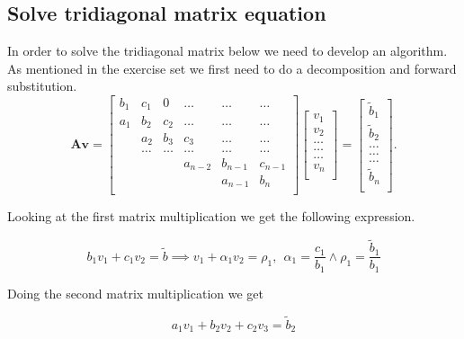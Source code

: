 \documentclass[reprint, english,notitlepage]{revtex4-1}  %
\begin{document}
\subsection{Solve tridiagonal matrix equation}

In order to solve the tridiagonal matrix below we need to develop an algorithm. As mentioned in the exercise set \citep{oppgavetekst} we first need to do a decomposition and forward substitution.
\begin{equation*}
\mathbf{A}\mathbf{v} = \begin{bmatrix}
b_1& c_1 & 0 &\dots   & \dots &\dots \\
a_1 & b_2 & c_2 &\dots &\dots &\dots \\
& a_2 & b_3 & c_3 & \dots & \dots \\
& \dots   & \dots &\dots   &\dots & \dots \\
&   &  &a_{n-2}  &b_{n-1}& c_{n-1} \\
&    &  &   &a_{n-1} & b_n \\
\end{bmatrix}\begin{bmatrix}
v_1\\
v_2\\
\dots \\
\dots  \\
\dots \\
v_n\\
\end{bmatrix}
=\begin{bmatrix}
\tilde{b}_1\\
\tilde{b}_2\\
\dots \\
\dots \\
\dots \\
\tilde{b}_n\\
\end{bmatrix}.
\end{equation*}

Looking at the first matrix multiplication we get the following expression.

\begin{equation}
	b_1 v_1 + c_1 v_2 = \tilde{b} \implies v_1 + \alpha_1 v_2 = \rho _1, \ \ \alpha_1 = \frac{c_1}{b_1} \wedge \rho_1 = \frac{\tilde{b}_1}{b_1} 
	\label{eq:mat1}
\end{equation}

Doing the second matrix multiplication we get

\begin{equation}
	a_1 v_1 + b_2 v_2 + c_2 v_3 = \tilde{b}_2
	\label{eq:mat2}
\end{equation}
\end{document}

